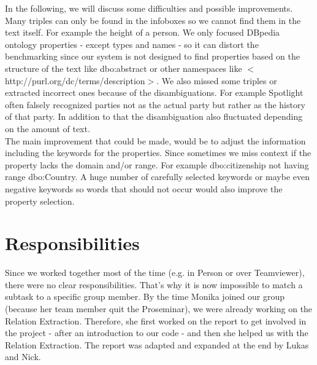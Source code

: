 \documentclass[runningheads]{llncs}
\begin{document}
In the following, we will discuss some difficulties and possible improvements. Many triples can only be found in the infoboxes so we cannot find them in the text itself. For example the height of a person. We only focused DBpedia ontology properties - except types and names - so it can distort the benchmarking since our system is not designed to find properties based on the structure of the text like dbo:abstract or other namespaces like $<$http://purl.org/dc/terms/description$>$. We also missed some triples or extracted incorrect ones because of the disambiguations. For example Spotlight often falsely recognized parties not as the actual party but rather as the history of that party. In addition to that the disambiguation also fluctuated depending on the amount of text.\\

The main improvement that could be made, would be to adjust the information including the keywords for the properties. Since sometimes we miss context if the property lacks the domain and/or range. For example dbo:citizenship not having range dbo:Country. A huge number of carefully selected keywords or maybe even negative keywords so words that should not occur would also improve the property selection. 


\section{Responsibilities}
Since we worked together most of the time (e.g. in Person or over Teamviewer), there were no clear responsibilities. That's why it is now impossible to match a subtask to a specific group member. By the time Monika joined our group (because her team member quit the Proseminar), we were already working on the Relation Extraction. Therefore, she first worked on the report to get involved in the project - after an introduction to our code - and then she helped us with the Relation Extraction.
The report was adapted and expanded at the end by Lukas and Nick.
 
%
%



%
\end{document}
